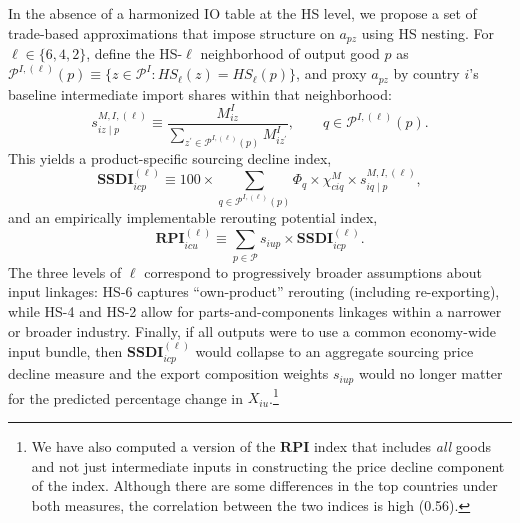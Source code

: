 \documentclass[english,12pt]{article}
\theoremstyle{definition}
\begin{document}
In the absence of a harmonized IO table at the HS level, we propose a set of
trade-based approximations that impose structure on $a_{pz}$ using HS nesting.
For $\ell\in\{6,4,2\}$, define the HS-$\ell$ neighborhood of output good $p$ as
$\mathcal{P}^{I,(\ell)}(p)\equiv\{z\in\mathcal{P}^{I}:HS_{\ell}(z)=HS_{\ell}(p)\}$,
and proxy $a_{pz}$ by country $i$'s baseline intermediate import shares within
that neighborhood:
\begin{equation*}
s_{iz\mid p}^{M,I,(\ell)}\equiv \frac{M_{iz}^{I}}{\sum_{z^{\prime}\in\mathcal{P}^{I,(\ell)}(p)}M_{iz^{\prime}}^{I}},
\qquad q\in\mathcal{P}^{I,(\ell)}(p).
\end{equation*}%
This yields a product-specific sourcing decline index,
\begin{equation*}
\boldsymbol{SSDI}_{icp}^{(\ell)}\equiv 100 \times\sum_{q\in\mathcal{P}^{I,(\ell)}(p)}
\Phi_{q}\times \chi_{ciq}^{M}\times s_{iq\mid p}^{M,I,(\ell)},
\end{equation*}%
and an empirically implementable rerouting potential index,
\begin{equation}
\boldsymbol{RPI}_{icu}^{(\ell)}\equiv \sum_{p\in\mathcal{P}} s_{iup}\times
\boldsymbol{SSDI}_{icp}^{(\ell)}.
\label{eq: RPI HS}
\end{equation}%
The three levels of $\ell$ correspond to progressively broader assumptions
about input linkages: HS-6 captures ``own-product'' rerouting (including
re-exporting), while HS-4 and HS-2 allow for parts-and-components linkages
within a narrower or broader industry. Finally, if all outputs were to use a
common economy-wide input bundle, then $\boldsymbol{SSDI}_{icp}^{(\ell)}$
would collapse to an aggregate sourcing price decline measure and the export
composition weights $s_{iup}$ would no longer matter for the predicted
percentage change in $X_{iu}$.\footnote{We have also computed a version of the $\boldsymbol{RPI}$ index that includes \emph{all} goods and not just intermediate inputs in constructing the price decline component of the index. Although there
are some differences in the top countries under both measures, the correlation between the two indices is high (0.56).}
\end{document}
